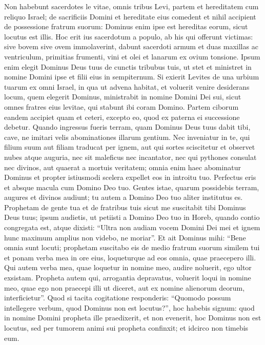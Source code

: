 \begin{biblechapter} 
\verse Non habebunt sacerdotes le vitae, omnis tribus Levi, partem et hereditatem cum reliquo Israel; de sacrificiis Domini et hereditate eius comedent 
\verse et nihil accipient de possessione fratrum suorum: Dominus enim ipse est hereditas eorum, sicut locutus est illis. 
\verse Hoc erit ius sacerdotum a populo, ab his qui offerunt victimas: sive bovem sive ovem immolaverint, dabunt sacerdoti armum et duas maxillas ac ventriculum, 
\verse primitias frumenti, vini et olei et lanarum ex ovium tonsione. 
\verse Ipsum enim elegit Dominus Deus tuus de cunctis tribubus tuis, ut stet et ministret in nomine Domini ipse et filii eius in sempiternum. 
\verse Si exierit Levites de una urbium tuarum ex omni Israel, in qua ut advena habitat, et voluerit venire desiderans locum, quem elegerit Dominus, 
\verse ministrabit in nomine Domini Dei sui, sicut omnes fratres eius levitae, qui stabunt ibi coram Domino. 
\verse Partem ciborum eandem accipiet quam et ceteri, excepto eo, quod ex paterna ei successione debetur. 
\verse Quando ingressus fueris terram, quam Dominus Deus tuus dabit tibi, cave, ne imitari velis abominationes illarum gentium. 
\verse Nec inveniatur in te, qui filium suum aut filiam traducat per ignem, aut qui sortes sciscitetur et observet nubes atque auguria, nec sit maleficus 
\verse nec incantator, nec qui pythones consulat nec divinos, aut quaerat a mortuis veritatem; 
\verse omnia enim haec abominatur Dominus et propter istiusmodi scelera expellet eos in introitu tuo. 
\verse Perfectus eris et absque macula cum Domino Deo tuo. 
\verse Gentes istae, quarum possidebis terram, augures et divinos audiunt; tu autem a Domino Deo tuo aliter institutus es. 
\verse Prophetam de gente tua et de fratribus tuis sicut me suscitabit tibi Dominus Deus tuus; ipsum audietis, 
\verse ut petiisti a Domino Deo tuo in Horeb, quando contio congregata est, atque dixisti: “Ultra non audiam vocem Domini Dei mei et ignem hunc maximum amplius non videbo, ne moriar”. 
\verse Et ait Dominus mihi: “Bene omnia sunt locuti; 
\verse prophetam suscitabo eis de medio fratrum suorum similem tui et ponam verba mea in ore eius, loqueturque ad eos omnia, quae praecepero illi. 
\verse Qui autem verba mea, quae loquetur in nomine meo, audire noluerit, ego ultor exsistam. 
\verse Propheta autem qui, arrogantia depravatus, voluerit loqui in nomine meo, quae ego non praecepi illi ut diceret, aut ex nomine alienorum deorum, interficietur”. 
\verse Quod si tacita cogitatione responderis: “Quomodo possum intellegere verbum, quod Dominus non est locutus?”, 
\verse hoc habebis signum: quod in nomine Domini propheta ille praedixerit, et non evenerit, hoc Dominus non est locutus, sed per tumorem animi sui propheta confinxit; et idcirco non timebis eum. 
\end{biblechapter}

